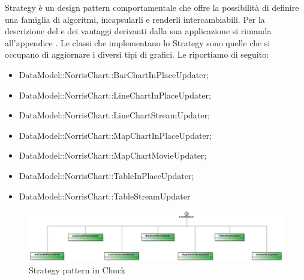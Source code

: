 			Strategy è un design pattern comportamentale che offre la possibilità di definire una famiglia di
algoritmi, incapsularli e renderli intercambiabili. Per la descrizione del  e dei vantaggi derivanti dalla sua applicazione si rimanda all'appendice .
					Le classi che implementano lo Strategy sono quelle che si occupano di aggiornare i diversi tipi di grafici. Le riportiamo di seguito:
					\begin{itemize}
					\item DataModel::NorrisChart::BarChartInPlaceUpdater;
					\item DataModel::NorrisChart::LineChartInPlaceUpdater;
					\item DataModel::NorrisChart::LineChartStreamUpdater;
					\item DataModel::NorrisChart::MapChartInPlaceUpdater;
					\item DataModel::NorrisChart::MapChartMovieUpdater;
					\item DataModel::NorrisChart::TableInPlaceUpdater;
					\item DataModel::NorrisChart::TableStreamUpdater
				\end{itemize}
				\begin{figure}[H]\centering
	        		\includegraphics[width=\textwidth]{SpecificaTecnica/Pics/DesignPatternNorris/Strategy}
	        		\caption{Strategy pattern in Chuck}
	    		\end{figure}
	    	
